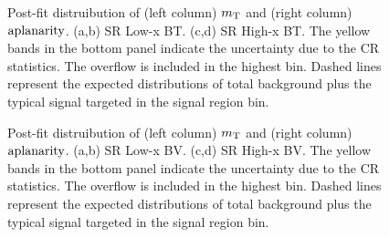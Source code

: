 \clearpage
\begin{figure}[h]
  \centering
   \caption{   
     Post-fit distruibution of (left column) $m_{\mathrm{T}}$ and (right column) $\mathrm{aplanarity}$.
     (a,b) SR Low-x BT.
     (c,d) SR High-x BT.
     The yellow bands in the bottom panel indicate the uncertainty due to the CR statistics. The overflow is included in the highest bin. Dashed lines represent the expected distributions of total background plus the typical signal targeted in the signal region bin.
     \label{fig::BGestimation::SRVRpostFit::SRVarxBT}
   }
\end{figure}

\clearpage
\begin{figure}[h]
  \centering
   \caption{   
     Post-fit distruibution of (left column) $m_{\mathrm{T}}$ and (right column) $\mathrm{aplanarity}$.
     (a,b) SR Low-x BV.
     (c,d) SR High-x BV.
     The yellow bands in the bottom panel indicate the uncertainty due to the CR statistics. The overflow is included in the highest bin. Dashed lines represent the expected distributions of total background plus the typical signal targeted in the signal region bin.
     \label{fig::BGestimation::SRVRpostFit::SRVarxBV}
   }
\end{figure}


